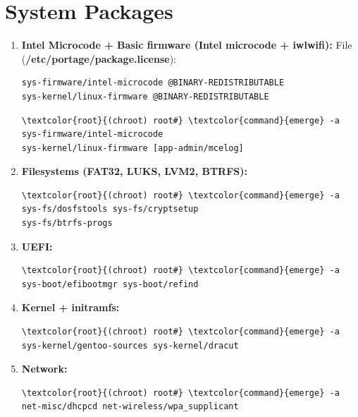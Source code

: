 \documentclass[10pt, a4paper, onecolumn, oneside, titlepage, openany]{book}
\begin{document}
\section{System Packages}
\begin{enumerate}
    \item \textbf{Intel Microcode + Basic firmware (Intel microcode + iwlwifi):}
\newline File (\textbf{\textcolor{file}{/etc/portage/package.license}}):
\begin{Verbatim}[commandchars=\\\{\}]
sys-firmware/intel-microcode @BINARY-REDISTRIBUTABLE
sys-kernel/linux-firmware @BINARY-REDISTRIBUTABLE
\end{Verbatim}
\begin{Verbatim}[commandchars=\\\{\}]
\textcolor{root}{(chroot) root#} \textcolor{command}{emerge} -a sys-firmware/intel-microcode
sys-kernel/linux-firmware [app-admin/mcelog]
\end{Verbatim}
    \item \textbf{Filesystems (FAT32, LUKS, LVM2, BTRFS):}
\begin{Verbatim}[commandchars=\\\{\}]
\textcolor{root}{(chroot) root#} \textcolor{command}{emerge} -a sys-fs/dosfstools sys-fs/cryptsetup
sys-fs/btrfs-progs
\end{Verbatim}
    \item \textbf{UEFI:}
\begin{Verbatim}[commandchars=\\\{\}]
\textcolor{root}{(chroot) root#} \textcolor{command}{emerge} -a sys-boot/efibootmgr sys-boot/refind
\end{Verbatim}
    \item \textbf{Kernel + initramfs:}
\begin{Verbatim}[commandchars=\\\{\}]
\textcolor{root}{(chroot) root#} \textcolor{command}{emerge} -a sys-kernel/gentoo-sources sys-kernel/dracut
\end{Verbatim}
    \item \textbf{Network:}
\begin{Verbatim}[commandchars=\\\{\}]
\textcolor{root}{(chroot) root#} \textcolor{command}{emerge} -a net-misc/dhcpcd net-wireless/wpa_supplicant
\end{Verbatim}
\end{enumerate}
\end{document}
